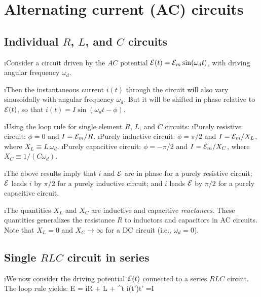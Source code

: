 \section{Alternating current (AC) circuits}

\subsection{Individual $R$, $L$, and $C$ circuits}
\bi

\i Consider a circuit driven by the $AC$ potential
${\cal E}(t) = {\cal E}_m\sin(\omega_d t)$, with driving angular frequency $\omega_d$.

\i Then the instantaneous current $i(t)$ through the circuit will also vary sinusoidally
with angular frequency $\omega_d$.
But it will be shifted in phase relative to ${\cal E}(t)$, 
so that $i(t) = I \sin(\omega_d t - \phi)$.

\i Using the loop rule for single element $R$, $L$, and $C$ circuits:
%
\ben
\i Purely resistive circuit: $\phi=0$ and $I = {\cal E}_m/R$.
\i Purely inductive circuit: $\phi=\pi/2$ and $I = {\cal E}_m/X_L$, where $X_L \equiv L\,\omega_d$.
\i Purely capacitive circuit: $\phi=-\pi/2$ and $I = {\cal E}_m/X_C$, where $X_C \equiv 1/(C\omega_d)$.
\een

\i The above results imply that 
$i$ and ${\cal E}$ are in phase for a purely resistive circuit;
${\cal E}$ leads $i$ by $\pi/2$ for a purely inductive circuit; 
and $i$ leads ${\cal E}$ by $\pi/2$ for a purely capacitive circuit.

\i The quantities $X_L$ and $X_C$ are inductive and capacitive {\it reactances}.
These quantities generalizes the resistance $R$ to inductors and capacitors in 
AC circuits.
Note that $X_L=0$ and $X_C\rightarrow\infty$ for a DC circuit (i.e., $\omega_d=0$).

\ei

\subsection{Single $RLC$ circuit in series}

\bi
\i We now consider the driving potential ${\cal E}(t)$ connected to 
a series $RLC$ circuit.
The loop rule yields:
\be
{\cal E} = iR + L + \int^t \> i(t')\dd t'
=I
\ee


